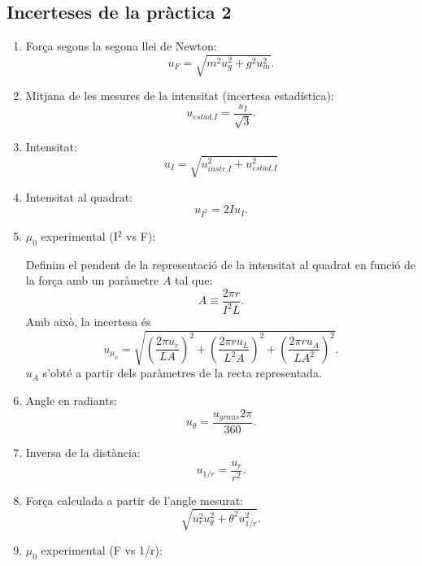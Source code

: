 \documentclass[a4paper,10.5pt]{report}
\begin{document}
\begin{appendices}
\subsection{Incerteses de la pràctica 2}
\begin{enumerate}
	\item Força segons la segona llei de Newton: \begin{equation}
		u_F=\sqrt{m^2u_g^2+g^2u_m^2}.
	\end{equation}
	\item Mitjana de les mesures de la intensitat (incertesa estadística): \begin{equation}
		u_{estad. I}= \frac{s_I}{\sqrt{3}}.
	\end{equation}
	\item Intensitat: \begin{equation}
		u_I=\sqrt{u_{instr. I}^2+u_{estad. I}^2}
	\end{equation}
	\item Intensitat al quadrat: \begin{equation}
		u_{I^2}=2Iu_I.
	\end{equation}
	\item $\mu_0$ experimental (I$^2$ vs F):

	Definim el pendent de la representació de la intensitat al quadrat en funció de la força amb un paràmetre $A$ tal que:
	\begin{equation*}
		A\equiv\frac{2\pi r}{I^2L}.
	\end{equation*}
	Amb això, la incertesa és
	\begin{equation}
		u_{\mu_0}=\sqrt{\left(\frac{2\pi u_r}{LA}\right)^2+\left(\frac{2\pi r u_L}{L^2A}\right)^2+\left(\frac{2\pi ru_A}{LA^2}\right)^2}.
	\end{equation}
	$u_A$ s'obté a partir dels paràmetres de la recta representada.
	\item Angle en radiants: \begin{equation}
		u_{\theta}=\frac{u_{graus}2\pi}{360}.
	\end{equation}
	\item Inversa de la distància: \begin{equation}
		u_{1/r}=\frac{u_r}{r^2}.
	\end{equation}
	\item Força calculada a partir de l'angle mesurat: \begin{equation}
		\sqrt{u_r^2u_{\theta}^2+\theta^2u_{1/r}^2}.
	\end{equation}
	\item $\mu_0$ experimental (F vs 1/r):
	

\end{enumerate}
\end{appendices}
\end{document}
